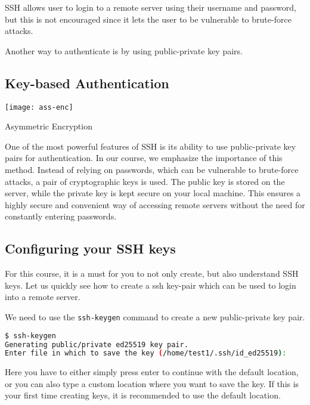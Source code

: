SSH allows user to login to a remote server using
their username and password, but this is not encouraged
since it lets the user to be vulnerable to brute-force
attacks.

Another way to authenticate is by using public-private
key pairs.

\subsection{Key-based Authentication}

\begin{marginfigure}
  \texttt{[image: ass-enc]}
  \caption{Asymmetric Encryption}
\end{marginfigure}

One of the most powerful features of SSH is its ability
to use public-private key pairs for authentication. In
our course, we emphasize the importance of this method.
Instead of relying on passwords, which can be vulnerable
to brute-force attacks, a pair of cryptographic keys is used.
The public key is stored on the server, while the private key
is kept secure on your local machine. This ensures a highly
secure and convenient way of accessing remote servers without
the need for constantly entering passwords.

\subsection{Configuring your SSH keys}

For this course, it is a must for you to not only
create, but also understand SSH keys.
Let us quickly see how to create a ssh key-pair
which can be used to login into a remote server.

We need to use the \lstinline|ssh-keygen|
command to create a new public-private
key pair.

\begin{lstlisting}[language=bash]
$ ssh-keygen
Generating public/private ed25519 key pair.
Enter file in which to save the key (/home/test1/.ssh/id_ed25519):
\end{lstlisting}

Here you have to either simply press enter to
continue with the default location, or you can
also type a custom location where you want to
save the key. If this is your first time creating
keys, it is recommended to use the default location.

